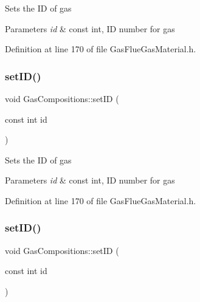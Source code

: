 Sets the ID of gas 
\begin{DoxyParams}{Parameters}
{\em id} & const int, ID number for gas \\
\hline
\end{DoxyParams}


Definition at line 170 of file Gas\+Flue\+Gas\+Material.\+h.

\mbox{\label{class_gas_compositions_a9fc3ebfcbda7134b67ed76a39b4c94cc}} 
\subsubsection{\texorpdfstring{set\+I\+D()}{setID()}\hspace{0.1cm}{\footnotesize\ttfamily [2/3]}}
{\footnotesize\ttfamily void Gas\+Compositions\+::set\+ID (\begin{DoxyParamCaption}\item[{const int}]{id }\end{DoxyParamCaption})\hspace{0.3cm}{\ttfamily [inline]}}

Sets the ID of gas 
\begin{DoxyParams}{Parameters}
{\em id} & const int, ID number for gas \\
\hline
\end{DoxyParams}


Definition at line 170 of file Gas\+Flue\+Gas\+Material.\+h.

\mbox{\label{class_gas_compositions_a9fc3ebfcbda7134b67ed76a39b4c94cc}} 
\subsubsection{\texorpdfstring{set\+I\+D()}{setID()}\hspace{0.1cm}{\footnotesize\ttfamily [3/3]}}
{\footnotesize\ttfamily void Gas\+Compositions\+::set\+ID (\begin{DoxyParamCaption}\item[{const int}]{id }\end{DoxyParamCaption})\hspace{0.3cm}{\ttfamily [inline]}}

